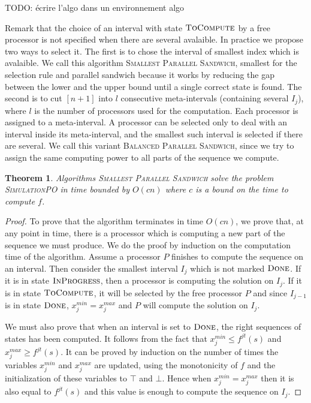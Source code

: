 \documentclass[a4paper,10pt]{article}
\newcommand{\todo}[1]{{\color{red} TODO: {#1}}}
\newtheorem{theorem}{Theorem}
\begin{document}
 \todo{écrire l'algo dans un environnement algo}
 
Remark that the choice of an interval with state $\textsc{ToCompute}$ by a free processor is not specified when there are several avalaible. In practice we propose two ways to select it. The first is to chose the interval of smallest index which is avalaible. We call this algorithm \textsc{Smallest Parallel Sandwich}, smallest for the selection rule and parallel sandwich because it works by 
reducing the gap between the lower and the upper bound until a single correct state is found. 
The second is to cut $[n+1]$ into $l$ consecutive meta-intervals (containing several $I_j$), where $l$ is the number of processors used for the computation. Each processor is assigned to a meta-interval. A processor can be selected only to deal with 
an interval inside its meta-interval, and the smallest such interval is selected if there are several. We call this variant 
 \textsc{Balanced Parallel Sandwich}, since we try to assign the same computing power to all parts of the sequence we compute. 
 
 
 \begin{theorem}\label{th:alg_ok}
  Algorithms \textsc{Smallest Parallel Sandwich} solve the problem \textsc{SimulationPO} in time bounded by $O(cn)$ where $c$ is a bound on the time to compute $f$.
  \end{theorem}
  
\begin{proof}
To prove that the algorithm terminates in time $O(cn)$, we prove that, at any point in time, there is a processor which is computing a new part of the sequence we must produce. We do the proof by induction on the computation time of the algorithm. Assume a processor $P$ finishes to compute the sequence on an interval. Then consider the smallest interval $I_j$ which is not marked $\textsc{Done}$. If it is in state $\textsc{InProgress}$, then a processor is computing the solution on $I_j$. If it is in state $\textsc{ToCompute}$, it will be selected by the free processor $P$ and since $I_{j-1}$ is in state $\textsc{Done}$, $x_j^{min} = x_j^{max}$ and $P$ will compute the solution on $I_j$.

We must also prove that when an interval is set to $\textsc{Done}$, the right sequences of states has been computed. 
It follows from the fact that  $x_j^{min} \leq f^{jt}(s)$ and $x_j^{max} \geq f^{jt}(s)$. It can be proved by induction on the number of times the variables $x_j^{min}$ and  $x_j^{max}$ are updated, using the monotonicity of $f$ and the initialization of these variables to $\top$ and $\bot$. Hence when $x_j^{min} = x_j^{max}$ then it is also equal to $f^{jt}(s)$ and this value is enough to 
compute the sequence on $I_j$. 
\end{proof}
\end{document}
